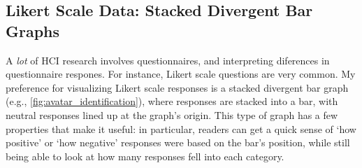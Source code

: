 


\subsection{Likert Scale Data: Stacked Divergent Bar Graphs}

A \emph{lot} of HCI research involves questionnaires, and interpreting diferences in questionnaire respones. For instance, Likert scale questions are very common. My preference for visualizing Likert scale responses is a stacked divergent bar graph (e.g., \autoref{fig:avatar_identification}), where responses are stacked into a bar, with neutral responses lined up at the graph's origin. This type of graph has a few properties that make it useful: in particular, readers can get a quick sense of `how positive' or `how negative' responses were based on the bar's position, while still being able to look at how many responses fell into each category. 

